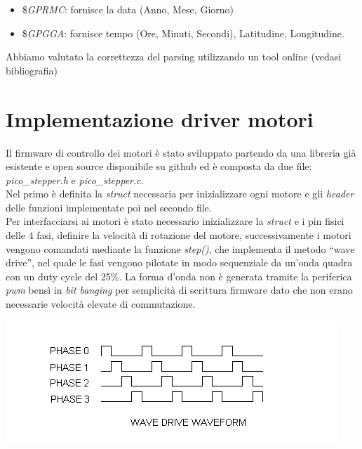 \begin{itemize}
\item
  
  \$\emph{GPRMC}: fornisce la data (Anno, Mese, Giorno)
  
\item
  
  \$\emph{GPGGA}: fornisce tempo (Ore, Minuti, Secondi), Latitudine,
  Longitudine.
  
\end{itemize}

\noindent Abbiamo valutato la correttezza del parsing utilizzando un tool online
(vedasi bibliografia)

\hypertarget{implementazione-driver-motori}{%
\section{Implementazione driver
motori}\label{implementazione-driver-motori}}

\noindent Il firmware di controllo dei motori è stato sviluppato partendo da una
libreria già esistente e open source disponibile su github ed è composta
da due file: \emph{pico\_stepper.h} e \emph{pico\_stepper.c}.\\
Nel primo è definita la \emph{struct} necessaria per inizializzare ogni
motore e gli \emph{header} delle funzioni implementate poi nel secondo
file.\\
Per interfacciarsi ai motori è stato necessario inizializzare la
\emph{struct} e i pin fisici delle 4 fasi, definire la velocità di
rotazione del motore, successivamente i motori vengono comandati
mediante la funzione \emph{step()}, che implementa il metodo ``wave
drive'', nel quale le fasi vengono pilotate in modo sequenziale da
un'onda quadra con un duty cycle del 25\%. La forma d'onda non è
generata tramite la periferica \emph{pwm} bensì in \emph{bit banging}
per semplicità di scrittura firmware dato che non erano necessarie
velocità elevate di commutazione.

\begin{center}
\includegraphics[scale=0.8]{figures/image50.png}
\captionsetup{type=figure}
\end{center}

